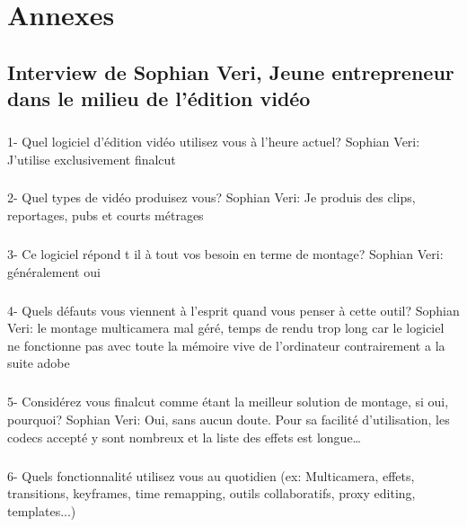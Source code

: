 \newpage

\chapter*{Annexes}
\section*{Interview de Sophian Veri,
Jeune entrepreneur dans le milieu de l'édition vidéo}

\paragraph{}
1-  Quel logiciel d'édition vidéo utilisez vous à l'heure actuel?
Sophian Veri: J'utilise exclusivement finalcut

\paragraph{}
2- Quel types de vidéo produisez vous?
Sophian Veri: Je produis des clips, reportages, pubs et courts métrages

\paragraph{}
3- Ce logiciel répond t il à tout vos besoin en terme de montage?
Sophian Veri: généralement oui

\paragraph{}
4- Quels défauts vous viennent à l'esprit quand vous penser à cette outil?
Sophian Veri: le montage multicamera mal géré, temps de rendu trop long car le
logiciel ne fonctionne pas avec toute la mémoire vive de l'ordinateur
contrairement a la suite adobe

\paragraph{}
5- Considérez vous finalcut comme étant la meilleur solution de montage,
si oui, pourquoi?
Sophian Veri: Oui, sans aucun doute. Pour sa facilité d'utilisation,
les codecs accepté y sont nombreux et la liste des effets est
longue\ldots

\paragraph{}
6-  Quels fonctionnalité utilisez vous au quotidien (ex: Multicamera, effets,
transitions, keyframes, time remapping, outils collaboratifs, proxy
editing, templates...)

